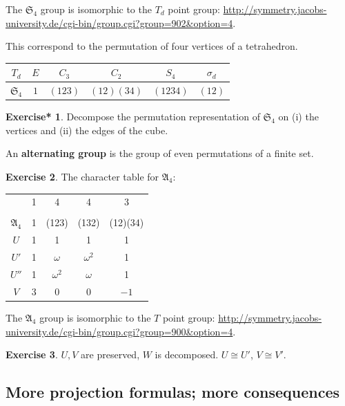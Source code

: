 \documentclass[12pt, letterpaper]{article}
\newcommand{\blue}[1]{{\color{blue} #1}}
\theoremstyle{definition}
\theoremstyle{remark}
\theoremstyle{definition}
\newtheorem{exe}{Exercise}[section]
\newtheorem{exe*}[exe]{Exercise*}
\theoremstyle{plain}
\numberwithin{equation}{section}
\begin{document}
	\blue{The $\mathfrak{S}_4$ group is isomorphic to the $T_d$ point group:}
	\url{http://symmetry.jacobs-university.de/cgi-bin/group.cgi?group=902&option=4}.
	
	This correspond to the permutation of four vertices of a tetrahedron.
	\begin{center}
		\begin{tabular}{c|c c c c c}
			$T_d$&$E$&$C_3$&$C_2$&$S_4$&$\sigma_d$\\
			\hline
			$\mathfrak{S}_4$&$1$&$(123)$&$(12)(34)$&$(1234)$&$(12)$\\
		\end{tabular}
	\end{center}
	
	\begin{exe*}
		 Decompose the permutation representation of $\mathfrak{S}_4$ on (i) the 
		vertices and (ii) the edges of the cube.
	\end{exe*}
	\begin{def*}
		An \textbf{alternating group} is the group of even permutations of a finite set.
	\end{def*}
	\begin{exe}
		The character table for $\mathfrak{A}_4$:
		
		\begin{center}
			\begin{tabular}{c | c c c c}
				&1&4&4&3\\
				&&&&\\
				$\mathfrak{A}_4$&1&(123)&(132)&(12)(34)\\
				\hline
				$U$&1&1&1&1\\
				$U'$&1&$\omega$&$\omega^2$&1\\
				$U''$&1&$\omega^2$&$\omega$&1\\
				$V$&3&0&0&$-1$\\
			\end{tabular}
		\end{center}
	\end{exe}
	\blue{The $\mathfrak{A}_4$ group is isomorphic to the $T$ point group:}
	\url{http://symmetry.jacobs-university.de/cgi-bin/group.cgi?group=900&option=4}.

	\begin{exe}
		$U, V$ are preserved,
		$W$ is decomposed.
		$U\cong U'$, $V\cong V'$.
	\end{exe}

	\subsection{More projection formulas; more consequences}
\end{document}
